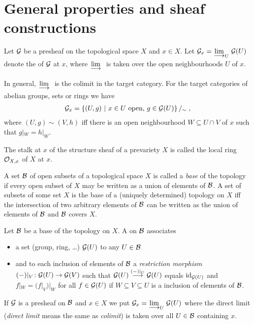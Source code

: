 \documentclass[a4paper,parskip=half,numbers=enddot, DIV=12]{scrreprt}
\begin{document}
\section{General properties and sheaf constructions}
\begin{defi}[Stalk]
    Let $\mathcal{G}$ be a presheaf on the topological space $X$ and $x\in X$. Let $\Gg_x = \colimit[U] \Gg(U)$ denote the  of $\mathcal{G}$ at $x$, where $\colimit$ is taken over the open neighbourhoods $U$ of $x$.
\end{defi}
\begin{rem*}
    In general, $\colimit$ is the colimit in the target category. For the target categories of abelian groups, sets or rings we have
    \begin{align*}
        \mathcal{G}_x = \left\{(U,g) \ \middle|\  x\in U \text{ open, } g\in \mathcal{G}(U)\right\}/_\sim\;,
    \end{align*}
    where $(U,g)\sim (V,h)$ iff there is an open neighbourhood $W\subseteq U\cap V$ of $x$ such that $g|_W = h|_W$. 
\end{rem*}
\begin{example}
    The stalk at $x$ of the structure sheaf of a prevariety $X$ is called the local ring $\mathcal{O}_{X,x}$ of $X$ at $x$.
\end{example}
\begin{rem*}
    A set $\mathcal{B}$ of open subsets of a topological space $X$ is called a \emph{base} of the topology if every open subset of $X$ may be written as a union of elements of $\mathcal{B}$. A set of subsets of some set $X$ is the base of a (uniquely determined) topology on $X$ iff the intersection of two arbitrary elements of $\mathcal{B}$ can be written as the union of elements of $\mathcal{B}$ and $\mathcal{B}$ covers $X$.
\end{rem*}
\begin{defi}
    Let $\mathcal{B}$ be a base of the topology on $X$. A  on $\mathcal{B}$ associates
    \begin{itemize}
    	\item a set (group, ring, \ldots) $\mathcal{G}(U)$ to any $U\in \mathcal{B}$
    	\item and to each inclusion of elements of $\mathcal{B}$ a \emph{restriction morphism}  		$(-)|_V\colon\Gg(U) \morphism \Gg(V)$
    	such that $\Gg(U) \morphism[(-)|_U]\Gg(U)$ equals $\operatorname{id}_{\mathcal{G}(U)}$ and $f|_W = (f|_V)|_W$ for all $f\in \mathcal{G}(U)$ if $W\subseteq V\subseteq U$ is a inclusion of elements of $\mathcal{B}$. 
    \end{itemize}
	 If $\mathcal{G}$ is a presheaf on $\mathcal{B}$ and $x\in X$ we put $\Gg_x = \colimit[U] \Gg(U)$ where the direct limit (\emph{direct limit} means the same as \emph{colimit}) is taken over all $U\in \mathcal{B}$ containing $x$.
\end{defi}
\end{document}
